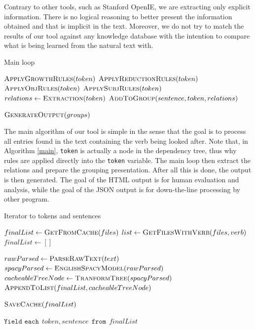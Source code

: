 \documentclass[11pt,a4paper,openright]{memoir}
\begin{document}
Contrary to other tools, such as Stanford OpenIE, we are extracting only explicit information. There is no logical reasoning to better present the information obtained and that is implicit in the text. Moreover, we do not try to match the results of our tool against any knowledge database with the intention to compare what is being learned from the natural text with.

\begin{algorithm}[t]
  \caption{Main loop}\label{main}
  \begin{algorithmic}[1]
	
       \State $\Call{ApplyGrowthRules}{token}$
       \State $\Call{ApplyReductionRules}{token}$
       \State $\Call{ApplyObjRules}{token}$
       \State $\Call{ApplySubjRules}{token}$
       \State $relations\gets \Call{Extraction}{token}$
       \State $\Call{AddToGroup}{sentence, token, relations}$
    \EndFor
    
    \State $\Call{GenerateOutput}{groups}$
    
    \EndProcedure
  \end{algorithmic}
\end{algorithm}

The main algorithm of our tool is simple in the sense that the goal is to process all entries found in the text containing the verb being looked after. Note that, in Algorithm \ref{main}, \texttt{token} is actually a node in the dependency tree, thus why rules are applied directly into the \texttt{token} variable. The main loop then extract the relations and prepare the grouping presentation. After all this is done, the output is then generated. The goal of the HTML output is for human evaluation and analysis, while the goal of the JSON output is for down-the-line processing by other program.

\begin{algorithm}[t]
  \caption{Iterator to tokens and sentences}\label{get_tokens}
  \begin{algorithmic}[1]
  
    		\State $finalList\gets \Call{GetFromCache}{files}$
       		\State $list\gets \Call{GetFilesWithVerb}{files, verb}$
       		\State $finalList\gets []$
    		
             \State $rawParsed\gets \Call{ParseRawText}{text}$
             \State $spacyParsed\gets \Call{EnglishSpacyModel}{rawParsed}$
             \State $cacheableTreeNode\gets \Call{TranformTree}{spacyParsed}$
             \State $\Call{AppendToList}{finalList, cacheableTreeNode}$
           \EndFor
        
       		\State $\Call{SaveCache}{finalList}$
    		\EndIf
    		
    \State $\texttt{Yield  each} \ \ token, sentence \ \ \texttt{from} \ \ finalList$

    \EndProcedure
    
  \end{algorithmic}
\end{algorithm}
\end{document}

